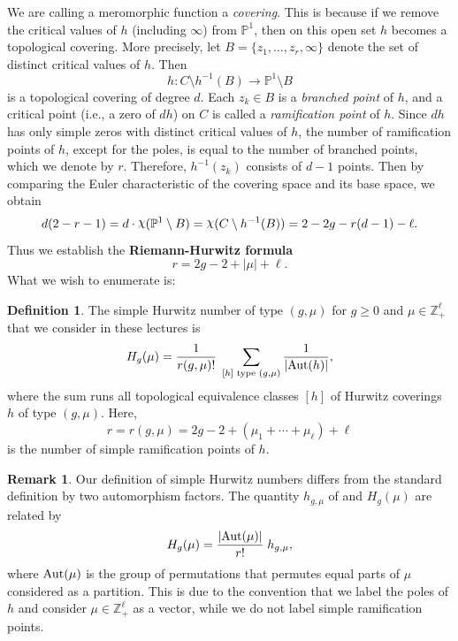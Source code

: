 \documentclass{amsart}
\theoremstyle{definition}
\newtheorem{Def}[thm]{Definition}
\newtheorem{rem}[thm]{Remark}
\numberwithin{equation}{section}
\numberwithin{figure}{section}
\def\rchi{{\hbox{\raise1.5pt\hbox{$\chi$}}}}
\def\Aut{{\text{\rm{Aut}}}}
\newcommand{\bP}{{\mathbb{P}}}
\newcommand{\bZ}{{\mathbb{Z}}}
\begin{document}
We are calling a meromorphic function 
a \emph{covering}. This is because if we
remove the critical values of $h$ (including $\infty$) from
$\bP^1$, then on this open set $h$ becomes
 a topological  covering. More precisely,
 let $B=\{z_1,\dots,z_r,\infty\}$ denote the
set of distinct critical values of $h$. 
Then 
$$h:C\setminus h^{-1}(B)
\longrightarrow \bP^1\setminus B$$ 
is a topological covering
of degree $d$. Each $z_k\in B$
 is a \emph{branched
point} of $h$, and a critical point (i.e., a zero of 
$dh$) on $C$ is called a \emph{ramification point}
of $h$. Since $dh$ has only simple zeros with
distinct critical values of $h$, the number of
ramification points of $h$, except for 
the poles, is equal to the number of branched points,
which we denote by $r$. Therefore, $h^{-1}(z_k)$
consists of $d-1$ points. Then by comparing
the Euler characteristic of the covering space and
its base space, we obtain
$$
d(2-r-1)=
d \cdot \rchi(\bP^1 \setminus B)
=\rchi(C\setminus h^{-1}(B))
\\
= 2-2g-r(d-1)-\ell.
$$
Thus we establish the  \textbf{Riemann-Hurwitz formula}
\begin{equation}
\label{eq:RH}
r=2g-2+|\mu|+\ell.
\end{equation}
What we wish to enumerate is:

\begin{Def}
The simple Hurwitz number of type $(g,\mu)$
for $g\ge 0$ and $\mu\in\bZ_+ ^\ell$
that we consider in these lectures is 
\begin{equation}
\label{eq:Hgmu}
H_g(\mu) = \frac{1}{r(g,\mu)!}\; \sum_{[h] \text{ type }
(g,\mu)}
\frac{1}{|\Aut(h)|},
\end{equation}
where the sum runs all topological equivalence classes $[h]$
of Hurwitz coverings $h$ of type $(g,\mu)$. 
Here,
$$
r=r(g,\mu) = 2g-2+(\mu_1+\cdots+\mu_\ell) + \ell
$$
is the number of simple ramification points
of $h$.
\end{Def}

\begin{rem}
Our definition of simple Hurwitz numbers
differs from the standard definition
by two automorphism factors. The quantity 
$h_{g,\mu}$ of \cite{ELSV} and $H_g(\mu)$
are related by
$$
H_g(\mu) = \frac{|\Aut(\mu)|}{r!} \; h_{g,\mu},
$$
where $\Aut(\mu)$ is the  group 
of permutations that permutes equal parts
of $\mu$ considered as a partition. 
This is due to the convention
that we label the poles of $h$ and consider
$\mu\in\bZ_+ ^\ell$ as a vector, 
while we do not label simple ramification points.
\end{rem}
\end{document}
